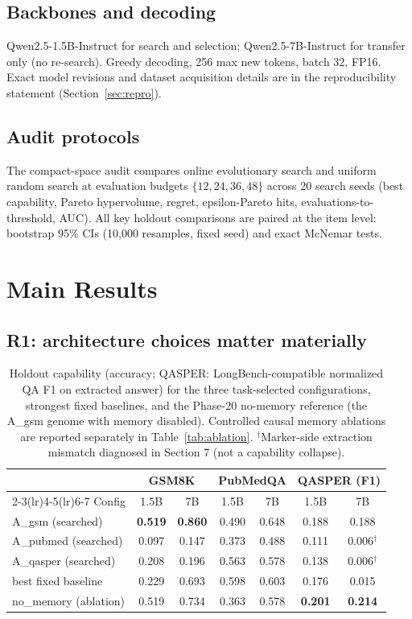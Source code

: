 \documentclass[11pt]{article}
\begin{document}
\subsection{Backbones and decoding}

Qwen2.5-1.5B-Instruct for search and selection; Qwen2.5-7B-Instruct for
transfer only (no re-search). Greedy decoding, 256 max new tokens, batch 32,
FP16. Exact model revisions and dataset acquisition details are in the
reproducibility statement (Section~\ref{sec:repro}).

\subsection{Audit protocols}

The compact-space audit compares online evolutionary search and uniform
random search at evaluation budgets $\{12, 24, 36, 48\}$ across 20 search
seeds (best capability, Pareto hypervolume, regret, epsilon-Pareto hits,
evaluations-to-threshold, AUC). All key holdout comparisons are paired at
the item level: bootstrap 95\% CIs (10{,}000 resamples, fixed seed) and
exact McNemar tests.

\section{Main Results}

\subsection{R1: architecture choices matter materially}

\begin{table}[t]
\centering\small
\begin{tabular}{@{}lcccccc@{}}
\toprule
 & \multicolumn{2}{c}{GSM8K} & \multicolumn{2}{c}{PubMedQA}
 & \multicolumn{2}{c}{QASPER (F1)} \\
\cmidrule(lr){2-3}\cmidrule(lr){4-5}\cmidrule(lr){6-7}
Config & 1.5B & 7B & 1.5B & 7B & 1.5B & 7B \\
\midrule
A\_gsm (searched) & \textbf{0.519} & \textbf{0.860} & 0.490 & 0.648 & 0.188 & 0.188 \\
A\_pubmed (searched) & 0.097 & 0.147 & 0.373 & 0.488 & 0.111 & 0.006$^\dagger$ \\
A\_qasper (searched) & 0.208 & 0.196 & 0.563 & 0.578 & 0.138 & 0.006$^\dagger$ \\
best fixed baseline & 0.229 & 0.693 & 0.598 & 0.603 & 0.176 & 0.015 \\
no\_memory (ablation) & 0.519 & 0.734 & 0.363 & 0.578 & \textbf{0.201} & \textbf{0.214} \\
\bottomrule
\end{tabular}
\caption{Holdout capability (accuracy; QASPER: LongBench-compatible
normalized QA F1 on extracted answer) for the three task-selected
configurations, strongest fixed baselines, and the Phase-20 no-memory reference (the A\_gsm genome with memory disabled). Controlled causal memory ablations are reported separately in Table~\ref{tab:ablation}.
$^\dagger$Marker-side extraction mismatch diagnosed in Section 7 (not a
capability collapse).}
\label{tab:main}
\end{table}
\end{document}
